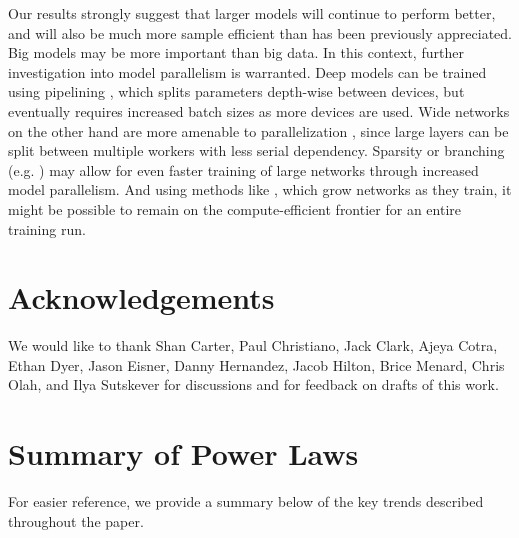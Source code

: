 \documentclass[english]{article}
\begin{document}
Our results strongly suggest that larger models will continue to perform better, and will also be much more sample efficient than has been previously appreciated.  Big models may be more important than big data.  In this context, further investigation into model parallelism is warranted. Deep models can be trained using pipelining \cite{DBLP:journals/corr/abs-1811-06965}, which splits parameters depth-wise between devices, but eventually requires increased batch sizes as more devices are used.  Wide networks on the other hand are more amenable to parallelization \cite{shazeer2018meshtensorflow}, since large layers can be split between multiple workers with less serial dependency.  Sparsity \cite{DBLP:journals/corr/abs-1904-10509,gray2017gpu} or branching (e.g. \cite{Krizhevsky:2012:ICD:2999134.2999257}) may allow for even faster training of large networks through increased model parallelism.  And using methods like \cite{Wang_2017,wen2019autogrow}, which grow networks as they train, it might be possible to remain on the compute-efficient frontier for an entire training run.

\section*{Acknowledgements}

We would like to thank Shan Carter, Paul Christiano, Jack Clark, Ajeya Cotra, Ethan Dyer, Jason Eisner, Danny Hernandez, Jacob Hilton, Brice Menard, Chris Olah, and Ilya Sutskever for discussions and for feedback on drafts of this work.

\newpage
\appendix
\appendixpage
\addappheadtotoc 

\section{Summary of Power Laws}

For easier reference, we provide a summary below of the key trends described throughout the paper.
\end{document}
